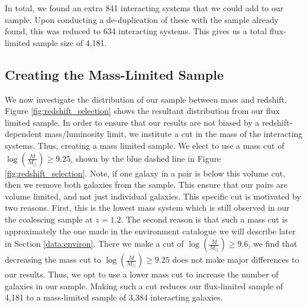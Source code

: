 In total, we found an extra 841 interacting systems that we could add to our sample. Upon conducting a de-duplication of these with the sample already found, this was reduced to 634 interacting systems. This gives us a total flux-limited sample size of 4,181.

\subsection{Creating the Mass-Limited Sample}
\noindent We now investigate the distribution of our sample between mass and redshift. Figure \ref{fig:redshift_selection} shows the resultant distribution from our flux limited sample. In order to ensure that our results are not biased by a redshift-dependent mass/luminosity limit, we institute a cut in the mass of the interacting systems. Thus, creating a mass limited sample. We elect to use a mass cut of $\log(\frac{M}{M_\odot}) \geq 9.25$, shown by the blue dashed line in Figure \ref{fig:redshift_selection}. Note, if one galaxy in a pair is below this volume cut, then we remove both galaxies from the sample. This ensure that our pairs are volume limited, and not just individual galaxies. This specific cut is motivated by two reasons. First, this is the lowest mass system which is still observed in our the coalescing sample at $z = 1.2$. The second reason is that such a mass cut is approximately the one made in the environment catalogue we will describe later in Section \ref{data:environ}. There we make a cut of $\log(\frac{M}{M_\odot}) \geq 9.6$, we find that decreasing the mass cut to $\log(\frac{M}{M_\odot}) \geq 9.25$ does not make major differences to our results. Thus, we opt to use a lower mass cut to increase the number of galaxies in our sample. Making such a cut reduces our flux-limited sample of 4,181 to a mass-limited sample of 3,384 interacting galaxies.

